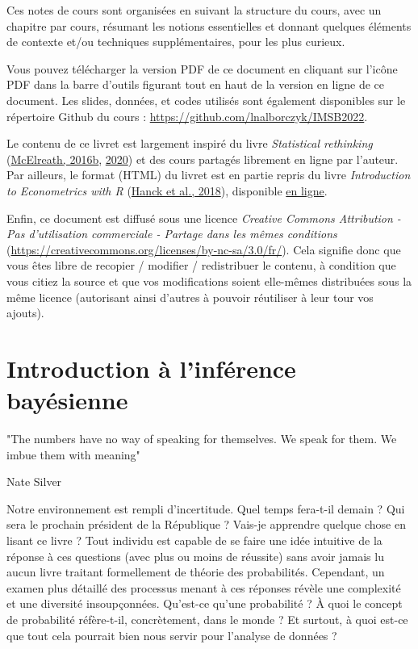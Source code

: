 \documentclass[
  a4paper,11pt,twoside,onecolumn,openright,final,oldfontcommands]{memoir}
\theoremstyle{definition}
\theoremstyle{definition}
\theoremstyle{definition}
\theoremstyle{definition}
\theoremstyle{remark}
\begin{document}
Ces notes de cours sont organisées en suivant la structure du cours, avec un chapitre par cours, résumant les notions essentielles et donnant quelques éléments de contexte et/ou techniques supplémentaires, pour les plus curieux.

Vous pouvez télécharger la version PDF de ce document en cliquant sur l'icône PDF dans la barre d'outils figurant tout en haut de la version en ligne de ce document. Les slides, données, et codes utilisés sont également disponibles sur le répertoire Github du cours : \url{https://github.com/lnalborczyk/IMSB2022}.

Le contenu de ce livret est largement inspiré du livre \emph{Statistical rethinking} (\protect\hyperlink{ref-mcelreath_statistical_2016}{McElreath, 2016b}, \protect\hyperlink{ref-mcelreath_statistical_2020}{2020}) et des cours partagés librement en ligne par l'auteur. Par ailleurs, le format (HTML) du livret est en partie repris du livre \emph{Introduction to Econometrics with R} (\protect\hyperlink{ref-hanck_introduction_2018}{Hanck et al., 2018}), disponible \href{https://bookdown.org/machar1991/ITER/}{en ligne}.

Enfin, ce document est diffusé sous une licence \emph{Creative Commons Attribution - Pas d'utilisation commerciale - Partage dans les mêmes conditions} (\url{https://creativecommons.org/licenses/by-nc-sa/3.0/fr/}). Cela signifie donc que vous êtes libre de recopier / modifier / redistribuer le contenu, à condition que vous citiez la source et que vos modifications soient elle-mêmes distribuées sous la même licence (autorisant ainsi d'autres à pouvoir réutiliser à leur tour vos ajouts).

\hypertarget{introduction}{%
\chapter{Introduction à l'inférence bayésienne}\label{introduction}}

\newcommand\given[1][]{\:#1\vert\:}

\epigraph{"The numbers have no way of speaking for themselves. We speak for them. We imbue them with meaning"}{Nate Silver}

Notre environnement est rempli d'incertitude. Quel temps fera-t-il demain ? Qui sera le prochain président de la République ? Vais-je apprendre quelque chose en lisant ce livre ? Tout individu est capable de se faire une idée intuitive de la réponse à ces questions (avec plus ou moins de réussite) sans avoir jamais lu aucun livre traitant formellement de théorie des probabilités. Cependant, un examen plus détaillé des processus menant à ces réponses révèle une complexité et une diversité insoupçonnées. Qu'est-ce qu'une probabilité ? À quoi le concept de probabilité réfère-t-il, concrètement, dans le monde ? Et surtout, à quoi est-ce que tout cela pourrait bien nous servir pour l'analyse de données ?
\end{document}
